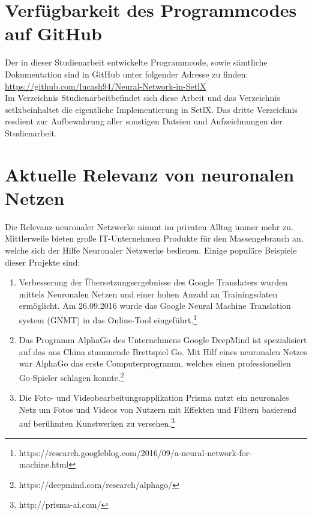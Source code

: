 \section{Verfügbarkeit des Programmcodes auf GitHub}
Der in dieser Studienarbeit entwickelte Programmcode, sowie sämtliche Dokumentation sind in GitHub unter folgender Adresse zu finden:
\\[0.2cm]
\hspace*{1.3cm}
\href{https://github.com/lucash94/Neural-Network-in-SetlX/}{https://github.com/lucash94/Neural-Network-in-SetlX}
\\[0.2cm]
Im Verzeichnis \glqq Studienarbeit\grqq befindet sich diese Arbeit und das Verzeichnis \glqq setlx\grqq beinhaltet die eigentliche Implementierung in SetlX. Das dritte Verzeichnis \glqq res\grqq dient zur Aufbewahrung aller sonstigen Dateien und Aufzeichnungen der Studienarbeit.

\section{Aktuelle Relevanz von neuronalen Netzen}
Die Relevanz neuronaler Netzwerke nimmt im privaten Alltag immer mehr zu. Mittlerweile bieten große IT-Unternehmen Produkte für den Massengebrauch an, welche sich der Hilfe Neuronaler Netzwerke bedienen. Einige populäre Beispiele dieser Projekte sind:
\begin{enumerate}
\item Verbesserung der Übersetzungsergebnisse des Google Translaters wurden mittels Neuronalen Netzen und einer hohen Anzahl an Trainingsdaten ermöglicht. Am 26.09.2016 wurde das Google Neural Machine Translation system (GNMT) in das Online-Tool eingeführt.\footnote{https://research.googleblog.com/2016/09/a-neural-network-for-machine.html}
\item Das Programm AlphaGo des Unternehmens Google DeepMind ist spezialisiert auf das aus China stammende Brettspiel Go. Mit Hilf eines neuronalen Netzes war AlphaGo das erste Computerprogramm, welches einen professionellen Go-Spieler schlagen konnte.\footnote{https://deepmind.com/research/alphago/}
\item Die Foto- und Videobearbeitungsapplikation Prisma nutzt ein neuronales Netz um Fotos und Videos von Nutzern mit Effekten und Filtern basierend auf berühmten Kunstwerken zu versehen.\footnote{http://prisma-ai.com/}
\end{enumerate}

